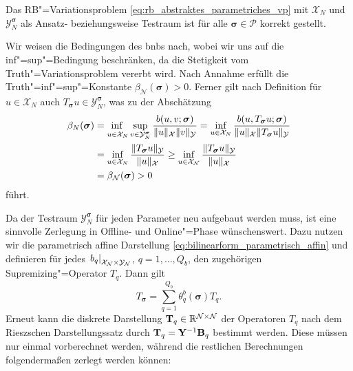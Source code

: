 \documentclass[../main.tex]{subfiles}
\begin{document}
\begin{Satz}\label{satz:rb_testraum_liefert_korrekt_gestelltes_problem}
    Das RB"=Variationsproblem \cref{eq:rb_abstraktes_parametriches_vp} mit $\mathcal X_{N}$ und $\mathcal Y_{N}^{\bm \sigma}$ als Ansatz- beziehungsweise Testraum ist für alle $\bm \sigma \in \mathcal P$ korrekt gestellt.

    \begin{Beweis}
        Wir weisen die Bedingungen des \acl{bnb}s nach, wobei wir uns auf die inf"=sup"=Bedingung beschränken, da die Stetigkeit vom Truth"=Variationsproblem vererbt wird.
        Nach Annahme erfüllt die Truth"=inf"=sup"=Konstante $\beta_{\mathcal N}(\bm \sigma) > 0$.
        Ferner gilt nach Definition für $u \in \mathcal X_{N}$ auch $T_{\bm \sigma}u \in \mathcal Y_{N}^{\bm \sigma}$, was zu der Abschätzung
        \begin{equation}
            \begin{aligned}
                \beta_{N}(\bm \sigma)
                &= \infsup{u \in \mathcal X_{N}}{v \in \mathcal Y_{N}^{\bm \sigma}} \frac{b(u, v; \bm \sigma)}{\norm{u}_{\mathcal X} \norm{v}_{\mathcal Y}}
                = \inf_{u \in \mathcal X_{N}} \frac{b(u, T_{\bm \sigma}u; \bm \sigma)}{\norm{u}_{\mathcal X} \norm{T_{\bm \sigma} u}_{\mathcal Y}}
                \\&= \inf_{u \in \mathcal X_{N}} \frac{\norm{T_{\bm \sigma}u}_{\mathcal Y}}{\norm{u}_{\mathcal X}}
                \geq \inf_{u \in \mathcal X_{\mathcal N}} \frac{\norm{T_{\bm \sigma}u}_{\mathcal Y}}{\norm{u}_{\mathcal X}}
                \\&= \beta_{\mathcal N}(\bm \sigma) > 0
            \end{aligned}
        \end{equation}
        führt.
    \end{Beweis}
\end{Satz}

Da der Testraum $\mathcal Y_{N}^{\bm \sigma}$ für jeden Parameter neu aufgebaut werden muss, ist eine sinnvolle Zerlegung in Offline- und Online"=Phase wünschenswert.
Dazu nutzen wir die parametrisch affine Darstellung \cref{eq:bilinearform_parametrisch_affin} und definieren für jedes $\left.b_{q}\right|_{\mathcal X_{\mathcal N} \times \mathcal Y_{\mathcal N}}$, $q = 1, \dots, Q_b$, den zugehörigen Supremizing"=Operator $T_{q}$.
Dann gilt
\begin{equation}
    T_{\bm \sigma} = \sum_{q = 1}^{Q_b} \theta_{q}^{b}(\bm \sigma) T_{q}.
\end{equation}
Erneut kann die diskrete Darstellung $\mathbf{T}_{q} \in \mathbb{R}^{\mathcal N \times \mathcal N}$ der Operatoren $T_q$ nach dem Rieszschen Darstellungssatz durch $\mathbf{T}_{q} = \mathbf{Y}^{-1} \mathbf{B}_{q}$ bestimmt werden.
Diese müssen nur einmal vorberechnet werden, während die restlichen Berechnungen folgendermaßen zerlegt werden können:
\end{document}
